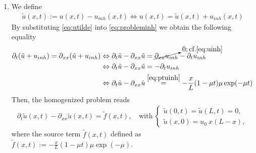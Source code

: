 \documentclass[12pt]{article}
\begin{document}
\begin{enumerate}
	\item We define
	      \begin{align}
		      \label{eq:utilde}
		      \tilde{u}(x,t) := u(x,t) - u_{inh}(x,t) 
		      \Leftrightarrow 
		      u(x,t) = \tilde{u}(x,t) + u_{inh}(x,t)
	      \end{align}
	      By substituting \eqref{eq:utilde} into \eqref{eq:probleminh} we obtain the following equality
	      \begin{align}
		      \partial_t(\tilde{u} + u_{inh}) = \partial_{xx}(\tilde{u} + u_{inh})
		       & \Leftrightarrow
		      \partial_t\tilde{u} - \partial_{xx}\tilde{u}
		      = \cancelto{0; \text{cf.} \eqref{eq:uinh}}{\partial_{xx}u_{inh}} - \partial_{t}u_{inh} \notag \\
		       & \Leftrightarrow
		      \partial_t\tilde{u} - \partial_{xx}\tilde{u}
		      = - \partial_{t}u_{inh}                                                                \notag \\
		       & \Leftrightarrow
		      \partial_t\tilde{u} - \partial_{xx}\tilde{u}
		      \stackrel{\eqref{eq:ptuinh}}{=}
		      - \frac{x}{L}(1-\mu t)\mu \exp(-\mu t)
	      \end{align}
	      Then, the homogenized problem reads
	      \begin{equation}
		      \label{eq:utildeeqn}
		      \boxed{
			      \begin{aligned}
				      \partial_t\tilde{u}(x,t) - \partial_{xx}\tilde{u}(x,t) = \tilde{f}(x,t),
				      \quad \text{with}
				      \
				      \begin{cases}
					      \tilde{u}(0,t)=\tilde{u}(L,t)= 0, \\
					      \tilde{u}(x,0)= u_{0}\ x(L-x),
				      \end{cases}
			      \end{aligned}
		      }
	      \end{equation}
	      where the source term $\tilde{f}(x,t)$ defined as 
	      $\displaystyle \tilde{f}(x,t) := -\frac{x}{L}(1-\mu t)\mu \exp(-\mu)$.
	      

\end{enumerate}
\end{document}
